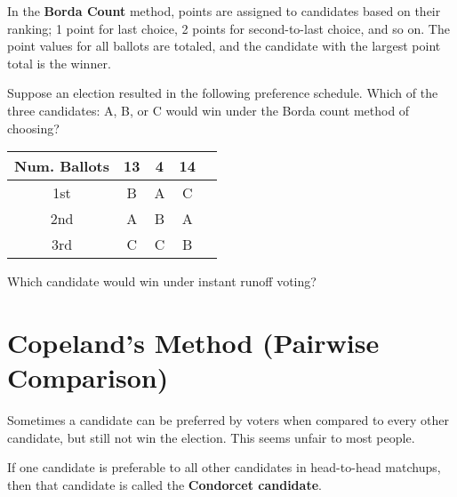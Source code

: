 \begin{definition}
  In the \textbf{Borda Count} method, points are assigned to
  candidates based on their ranking; 1 point for last choice, 2 points
  for second-to-last choice, and so on. The point values for all
  ballots are totaled, and the candidate with the largest point total
  is the winner.
\end{definition}

\begin{exercise}\label{ex:borda-count}
  Suppose an election resulted in the following preference schedule.
  Which of the three candidates: A, B, or C would win under the Borda
  count method of choosing?
  \begin{center}
    \begin{tabular}{ccccc}
      \toprule
      Num. Ballots & 13 & 4 & 14 \\
      \midrule
      1st & B & A & C \\
      2nd & A & B & A \\
      3rd & C & C & B \\
      \bottomrule
    \end{tabular}
  \end{center}

\end{exercise}

\begin{exercise}\label{ex:irv}
  Which candidate would win under instant runoff voting?

\end{exercise}

\newpage

\section{Copeland's Method (Pairwise Comparison)}%
\label{sec:copelands-method}

Sometimes a candidate can be preferred by voters when compared to
every other candidate, but still not win the election. This seems
unfair to most people.

\begin{definition}
  If one candidate is preferable to all other candidates in
  head-to-head matchups, then that candidate is called the
  \textbf{Condorcet candidate}.
\end{definition}


